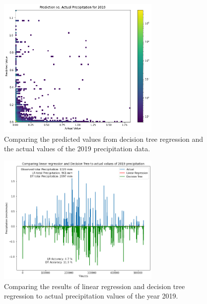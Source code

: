 \documentclass[11pt]{report}
\begin{document}
\begin{figure}[th!]
  \centering
  \includegraphics[width=0.7\textwidth]{Figures/predict_and_actual_2019_precip.png}
  \caption[Comparing ML predicted values to actual precipitation
    values]{Comparing the predicted values from decision tree
    regression and the actual values of the 2019 precipitation data.
  }
\end{figure}
\begin{figure}[bh!]
  \centering
  \includegraphics[width = 0.7\textwidth]{Figures/Comparison.png}
  \caption[Comparing ML results to actual precipitation values]{
    Comparing the results of linear regression and decision tree
    regression to actual precipitation values of the year 2019. %
}
\end{figure}
\end{document}
